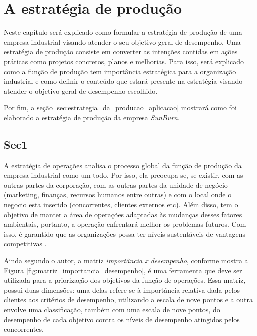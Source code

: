 \chapter{A estratégia de produção} 
\label{chap:estrategia_da_producao} 
Neste capítulo será explicado como formular a estratégia de produção de uma empresa industrial visando atender o seu objetivo geral de desempenho. Uma estratégia de produção consiste em converter as intenções contidas em ações práticas como projetos concretos, planos e melhorias. Para isso, será explicado como a função de produção tem importância estratégica para a organização industrial e como definir o conteúdo que estará presente na estratégia visando atender o objetivo geral de desempenho escolhido. 

Por fim, a seção \ref{sec:estrategia_da_producao_aplicacao} mostrará como foi elaborado a estratégia de produção da empresa \textit{SunBurn}. 

\section{Sec1} 
\label{sec:estrategia_da_producao_sec1} 
A estratégia de operações analisa o processo global da função de produção da empresa industrial como um todo. Por isso, ela preocupa-se, se existir, com as outras partes da corporação, com as outras partes da unidade de negócio (marketing, finanças, recursos humanos entre outras) e com o local onde o negocio esta inserido (concorrentes, clientes externos etc). Além disso, tem o objetivo de manter a área de operações adaptadas às mudanças desses fatores ambientais, portanto, a operação enfrentará melhor os problemas futuros. Com isso, é garantido que as organizações possa ter níveis sustentáveis de vantagens competitivas \cite{correa2000administracao}.

Ainda segundo o autor, a matriz \textit{importância x desempenho}, conforme mostra a Figura \ref{fig:matriz_importancia_desempenho},  é uma ferramenta que deve ser utilizada para a priorização dos objetivos da função de operações. Essa matriz, possui duas dimensões: uma delas refere-se à importância relativa dada pelos clientes aos critérios de desempenho, utilizando a escala de nove pontos e a outra envolve uma classificação, também com uma escala de nove pontos, do desempenho de cada objetivo contra os níveis de desempenho atingidos pelos concorrentes.

